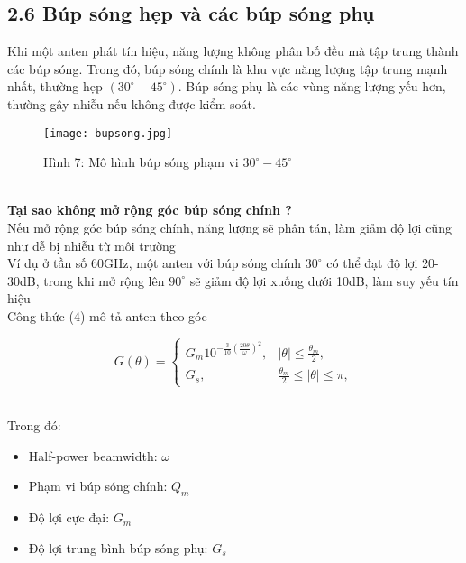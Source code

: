 \documentclass[a4paper,13pt]{article} %
\begin{document}
\subsection{2.6 Búp sóng hẹp và các búp sóng phụ}
Khi một anten phát tín hiệu, năng lượng không phân bố đều mà tập trung thành các búp sóng. Trong đó, búp sóng chính là khu vực năng lượng tập trung mạnh nhất, thường hẹp \( (30^\circ - 45^\circ) \). Búp sóng phụ là các vùng năng lượng yếu hơn, thường gây nhiễu nếu không được kiểm soát.

\begin{figure}[htbp]
    \centering
    \texttt{[image: bupsong.jpg]}
    \caption*{Hình 7: Mô hình búp sóng phạm vi \( 30^\circ - 45^\circ \)  \cite{key2} }
    \label{fig:model}
\end{figure}\\
\textbf{Tại sao không mở rộng góc búp sóng chính ?}\\
Nếu mở rộng góc búp sóng chính, năng lượng sẽ phân tán, làm giảm độ lợi cũng như dễ bị nhiễu từ môi trường \\
Ví dụ ở tần số 60GHz, một anten với búp sóng chính \( 30^\circ \) có thể đạt độ lợi 20-30dB, trong khi mở rộng lên \( 90^\circ \) sẽ giảm độ lợi xuống dưới 10dB, làm suy yếu tín hiệu\\
Công thức (4) mô tả anten theo góc {\theta} \\
\begin{center}
\begin{equation}
G(\theta) = 
\begin{cases} 
G_m 10^{-\frac{3}{10} \left(\frac{20\theta}{\omega}\right)^2}, & |\theta| \leq \frac{\theta_m}{2}, \\
G_s, & \frac{\theta_m}{2} \leq |\theta| \leq \pi,
\end{cases} \tag{4}
\end{equation}
\end{center}\\
Trong đó: \\
\begin{itemize}
    \item Half-power beamwidth: \( \omega \)
    \item Phạm vi búp sóng chính: \( Q_m \)
    \item Độ lợi cực đại: \( G_m \)
    \item Độ lợi trung bình búp sóng phụ: \( G_s \)
\end{itemize}
\end{document}
